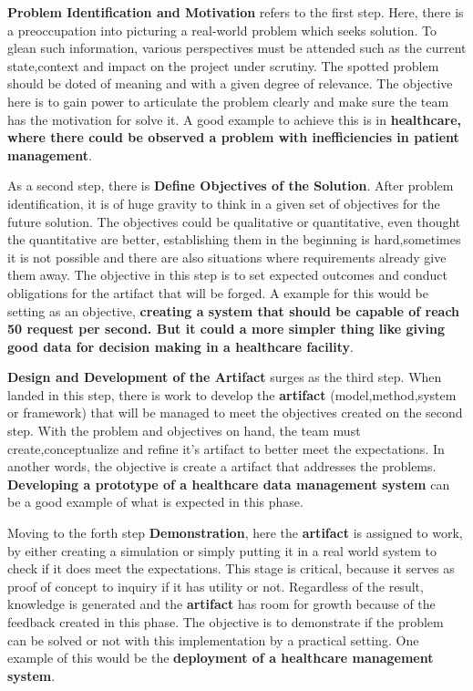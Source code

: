 \textbf{Problem Identification and Motivation} refers to the first step. Here, there is a preoccupation into picturing a real-world problem which seeks solution. To glean such information, various perspectives must be attended such as the current state,context and impact on the project under scrutiny. The spotted problem should be doted of meaning and with a given degree of relevance. The objective here is to gain power to articulate the problem clearly and make sure the team has the motivation for solve it. A good example to achieve this is in \textbf{healthcare, where there could be observed a problem with inefficiencies in patient management}.

As a second step, there is \textbf{Define Objectives of the Solution}. After problem identification, it is of huge gravity to think in a given set of objectives for the future solution. The objectives could be qualitative or quantitative, even thought the quantitative are better, establishing them in the beginning is hard,sometimes it is not possible and there are also situations where requirements already give them away. The objective in this step is to set expected outcomes and conduct obligations for the artifact that will be forged. A example for this would be setting as an objective, \textbf{creating a system that should be capable of reach 50 request per second. But it could a more simpler thing like giving good data for decision making in a healthcare facility}.

\textbf{Design and Development of the Artifact} surges as the third step. When landed in this step, there is work to develop the \textbf{artifact} (model,method,system or framework) that will be managed to meet the objectives created on the second step. With the problem and objectives on hand, the team must create,conceptualize and refine it's artifact to better meet the expectations. In another words, the objective is create a artifact that addresses the problems. \textbf{Developing a prototype of a healthcare data management system} can be a good example of what is expected in this phase.

 Moving to the forth step \textbf{Demonstration}, here the \textbf{artifact} is assigned to work, by either creating a simulation or simply putting it in a real world system to check if it does meet the expectations. This stage is critical, because it serves as proof of concept to inquiry if it has utility or not. Regardless of the result, knowledge is generated and the \textbf{artifact} has room for growth because of the feedback created in this phase. The objective is to demonstrate if the problem can be solved or not with this implementation by a practical setting. One example of this would be the \textbf{deployment of a healthcare management system}.

